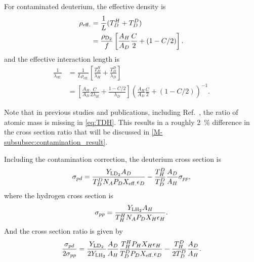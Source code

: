 \documentclass[../main.tex]{subfiles}
\begin{document}
For contaminated deuterium, the effective density is
\begin{equation}
	\begin{split}
		\rho_{\mathrm{eff.}} &= \frac{1}{L} (T_D^H + T_D^D)\\
		&=\frac{\rho_{\ce{D_2}}}{f} \left[ \frac{A_H}{A_D}\frac{C}{2}+(1-C/2) \right].
	\end{split}
\end{equation}
and the effective interaction length is
\begin{equation}
	\begin{split}
		\frac{1}{\lambda_{\mathrm{eff.}}} &= \frac{1}{L\rho_{\mathrm{eff.}}} \left[\frac{T_D^H}{\lambda_H} +\frac{T_D^D}{\lambda_D}\right]\\
		&=\left[\frac{A_H}{A_D}\frac{C}{2\lambda_H} + \frac{1-C/2}{\lambda_D}\right]\left( \frac{A_H}{A_D}\frac{C}{2} +(1-C/2)\right)^{-1}.
	\end{split}
\end{equation}

Note that in previous studies and publications, including Ref.~\cite{dove2021,dove2023},
the ratio of atomic mass is missing in \cref{eq:TDH}.
This results in a roughly \SI{2}{\percent} difference in the cross section ratio
that will be discussed in \cref{M-subsubsec:contamination_result}.

Including the contamination correction, the deuterium cross section is
\begin{equation}
	\sigma_{pd} = \frac{Y_{\ce{LD_2}} A_D}{T_D^D N_A P_D X_{\mathrm{eff.}} \epsilon_D} - \frac{T^D_H}{T_D^D} \frac{A_D}{A_H} \sigma_{pp},
\end{equation}
where the hydrogen cross section is
\begin{equation}
	\sigma_{pp} = \frac{Y_{\ce{LH_2}} A_H}{T_H^H N_A P_D X_{H} \epsilon_H}.
\end{equation}
And the cross section ratio is given by
\begin{equation}
	\frac{\sigma_{pd}}{2\sigma_{pp}} = \frac{Y_{\ce{LD_2}}}{2Y_{\ce{LH_2}}}\frac{A_D}{A_H}\frac{T_H^H P_H X_{H} \epsilon_H}{T_D^D P_D X_{\mathrm{eff.}} \epsilon_D} - \frac{T^D_H}{2T_D^D} \frac{A_D}{A_H}.
\end{equation}
\end{document}
